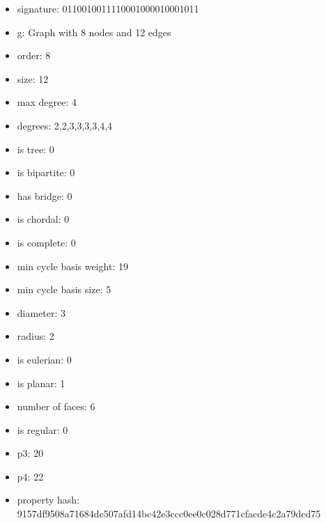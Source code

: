 \begin{itemize}
\item signature: 0110010011110001000010001011
\item g: Graph with 8 nodes and 12 edges
\item order: 8
\item size: 12
\item max degree: 4
\item degrees: 2,2,3,3,3,3,4,4
\item is tree: 0
\item is bipartite: 0
\item has bridge: 0
\item is chordal: 0
\item is complete: 0
\item min cycle basis weight: 19
\item min cycle basis size: 5
\item diameter: 3
\item radius: 2
\item is eulerian: 0
\item is planar: 1
\item number of faces: 6
\item is regular: 0
\item p3: 20
\item p4: 22
\item property hash: 9157df9508a71684dc507afd14bc42e3ccc0ee0c028d771cfacde4c2a79dcd75
\end{itemize}
\newpage
\begin{figure}
\end{figure}
